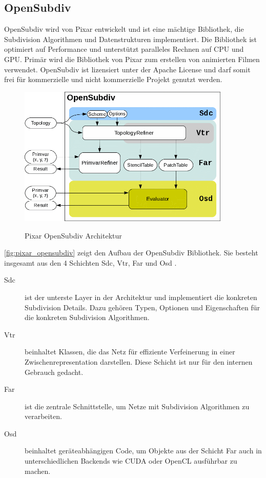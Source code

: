 \subsection{OpenSubdiv}

OpenSubdiv wird von Pixar entwickelt und ist eine mächtige Bibliothek, die Subdivision Algorithmen und Datenstrukturen implementiert.
Die Bibliothek ist optimiert auf Performance und unterstützt paralleles Rechnen auf CPU und GPU.
Primär wird die Bibliothek von Pixar zum erstellen von animierten Filmen verwendet.
OpenSubdiv ist lizensiert unter der Apache License und darf somit frei für kommerzielle und nicht kommerzielle Projekt genutzt werden.

\begin{figure}
  \caption{Pixar OpenSubdiv Architektur \cite{Pixar.27.07.2015}}
  \centering
  \includegraphics[width=0.9\textwidth]{content/media/pixar_opensubdiv}
  \label{fig:pixar_opensubdiv}
\end{figure}

\autoref{fig:pixar_opensubdiv} zeigt den Aufbau der OpenSubdiv Bibliothek.
Sie besteht insgesamt aus den 4 Schichten \ac{Sdc}, \ac{Vtr}, \ac{Far} und \ac{Osd} \cite{Pixar.27.07.2015}.

\begin{description}
 \item[\acs{Sdc}] ist der unterste Layer in der Architektur und implementiert die konkreten Subdivision Details.
 Dazu gehören Typen, Optionen und Eigenschaften für die konkreten Subdivision Algorithmen.
 \item[\acs{Vtr}] beinhaltet Klassen, die das Netz für effiziente Verfeinerung in einer Zwischenrepresentation darstellen.
 Diese Schicht ist nur für den internen Gebrauch gedacht.
 \item[\acs{Far}] ist die zentrale Schnittstelle, um Netze mit Subdivision Algorithmen zu verarbeiten.
 \item[\acs{Osd}] beinhaltet geräteabhängigen Code, um Objekte aus der Schicht \acs{Far} auch in unterschiedlichen Backends wie
 \acs{CUDA} oder OpenCL ausführbar zu machen.
\end{description}

